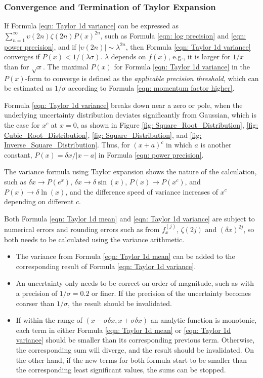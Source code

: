 \documentclass[twoside]{article}
\numberwithin{equation}{section}
\begin{document}
\subsubsection{Convergence and Termination of Taylor Expansion}


If Formula \eqref{eqn: Taylor 1d variance} can be expressed as $\sum_{n=1}^{\infty} \upsilon(2n) \zeta(2n) P(x)^{2n}$, such as Formula \eqref{eqn: log precision} and \eqref{eqn: power precision}, and if $|\upsilon(2n)| \sim \lambda^{2n}$, then Formula \eqref{eqn: Taylor 1d variance} converges if $P(x) < 1/(\lambda \sigma)$.
$\lambda$ depends on $f(x)$, e.g., it is larger for $1/x$ than for $\sqrt{x}$.
The maximal $P(x)$ for Formula \eqref{eqn: Taylor 1d variance} in the $P(x)$-form to converge is defined as the \emph{applicable precision threshold}, which can be estimated as $1/\sigma$ according to Formula \eqref{eqn: momentum factor higher}.

Formula \eqref{eqn: Taylor 1d variance} breaks down near a zero or pole, when the underlying uncertainty distribution deviates significantly from Gaussian, which is the case for $x^c$ at $x=0$, as shown in Figure \ref{fig: Square_Root_Distribution}, \ref{fig: Cubic_Root_Distribution}, \ref{fig: Square_Distribution}, and \ref{fig: Inverse_Square_Distribution}.
Thus, for $(x+a)^c$ in which $a$ is another constant, $P(x) = \delta x / |x - a|$ in Formula \eqref{eqn: power precision}.

The variance formula using Taylor expansion shows the nature of the calculation, such as $\delta x \rightarrow P(e^x)$, $\delta x \rightarrow \delta \sin(x)$, $P(x) \rightarrow P(x^c)$, and $P(x) \rightarrow \delta \ln(x)$, and the difference speed of variance increases of $x^c$ depending on different $c$.

Both Formula \eqref{eqn: Taylor 1d mean} and \eqref{eqn: Taylor 1d variance} are subject to numerical errors and rounding errors such as from $f^{(j)}_x$, $\zeta(2j)$ and $(\delta x)^{2j}$, so both needs to be calculated using the variance arithmetic.
\begin{itemize}
\item  The variance from Formula \eqref{eqn: Taylor 1d mean} can be added to the corresponding result of Formula \eqref{eqn: Taylor 1d variance}.

\item An uncertainty only needs to be correct on order of magnitude, such as with a precision of $1/\sigma=0.2$ or finer.
If the precision of the uncertainty becomes coarser than $1/\sigma$, the result should be invalidated.

\item If within the range of $(x - \sigma \delta x, x + \sigma \delta x)$ an analytic function is monotonic, each term in either Formula \eqref{eqn: Taylor 1d mean} or \eqref{eqn: Taylor 1d variance} should be smaller than its corresponding previous term.
Otherwise, the corresponding sum will diverge, and the result should be invalidated.
On the other hand, if the new terms for both formula start to be smaller than the corresponding least significant values, the sums can be stopped.

\end{itemize}
\end{document}

